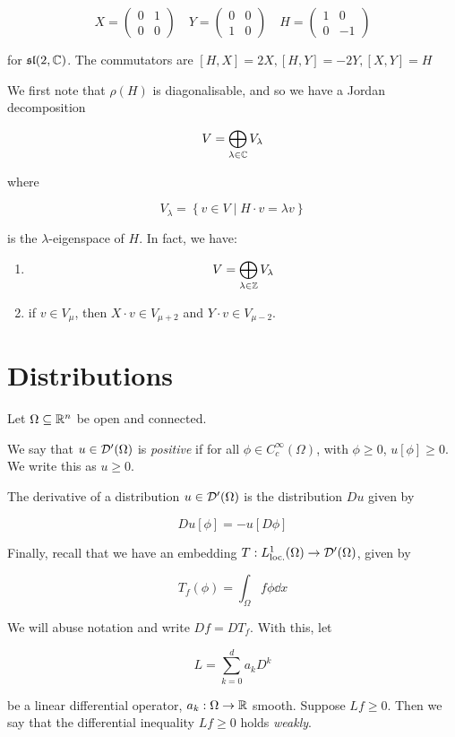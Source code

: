\documentclass{report}
\renewcommand{\sl}{\mathfrak{sl}}
\begin{document}
\[X = \begin{pmatrix}
    0 & 1 \\
    0 & 0
\end{pmatrix} \quad Y = \begin{pmatrix}
    0 & 0 \\
    1 & 0
\end{pmatrix} \quad H = \begin{pmatrix}
    1 & 0 \\
    0 & -1
\end{pmatrix}\]

for \(\sl(2, \C)\). The commutators are \([H, X] = 2X, [H, Y] = -2Y, [X,Y] = H\)

We first note that \(\rho(H)\) is diagonalisable, and so we have a Jordan decomposition

\[V = \bigoplus_{\lambda \in \mathbb{C}}V_\lambda\]

where

\[V_\lambda = \left\{v \in V \mid H \cdot v = \lambda v\right\}\]

is the \(\lambda\)-eigenspace of \(H\). In fact, we have:

\begin{enumerate}
    \item \[V = \bigoplus_{\lambda \in \mathbb{Z}}V_\lambda\]
    \item if \(v \in V_\mu\), then \(X \cdot v \in V_{\mu+2}\) and \(Y \cdot v \in V_{\mu-2}\).
\end{enumerate}

\section{Distributions}

\label{sec:distributions}

Let \(\Omega \subseteq \mathbb{R}^n\) be open and connected.

\begin{definition}
    [positive]
    We say that \(u \in \mathcal{D}'(\Omega)\) is \emph{positive} if for all \(\phi \in C_c^\infty(\Omega)\), with \(\phi \ge 0\), \(u[\phi] \ge 0\). We write this as \(u \ge 0\). 
\end{definition}

\begin{definition}
    [derivative]

    The derivative of a distribution \(u \in \mathcal{D}'(\Omega)\) is the distribution \(Du\) given by

    \[Du[\phi] = -u[D\phi]\]
\end{definition}

Finally, recall that we have an embedding \(T : L^1_\text{loc.}(\Omega) \to \mathcal{D}'(\Omega)\), given by

\[T_f(\phi) = \int_\Omega f\phi \dd x\]

We will abuse notation and write \(Df = DT_f\). With this, let

\[L = \sum_{k=0}^d a_k D^k\]

be a linear differential operator, \(a_k : \Omega \to \mathbb{R}\) smooth. Suppose \(Lf \ge 0\). Then we say that the differential inequality \(Lf \ge 0\) holds \emph{weakly}.

\printbibliography
\end{document}
